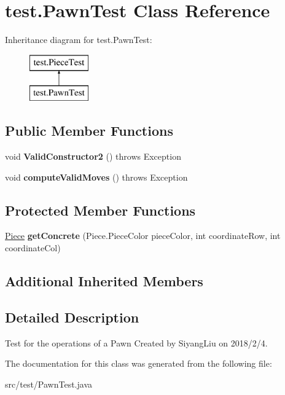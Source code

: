\hypertarget{classtest_1_1_pawn_test}{}\section{test.\+Pawn\+Test Class Reference}
\label{classtest_1_1_pawn_test}
Inheritance diagram for test.\+Pawn\+Test\+:\begin{figure}[H]
\begin{center}
\leavevmode
\includegraphics[height=2.000000cm]{classtest_1_1_pawn_test}
\end{center}
\end{figure}
\subsection*{Public Member Functions}
\begin{DoxyCompactItemize}
\item 
\mbox{\label{classtest_1_1_pawn_test_ac43e71ec6827ee2dede95103f600752b}} 
void {\bfseries Valid\+Constructor2} ()  throws Exception 
\item 
\mbox{\label{classtest_1_1_pawn_test_a6c5484d6c801d4ce7ba09d6a45aad74f}} 
void {\bfseries compute\+Valid\+Moves} ()  throws Exception 
\end{DoxyCompactItemize}
\subsection*{Protected Member Functions}
\begin{DoxyCompactItemize}
\item 
\mbox{\label{classtest_1_1_pawn_test_aa53df44fa4d9b2e462a0be226bfb7ccc}} 
\mbox{\hyperlink{classpieces_1_1_piece}{Piece}} {\bfseries get\+Concrete} (Piece.\+Piece\+Color piece\+Color, int coordinate\+Row, int coordinate\+Col)
\end{DoxyCompactItemize}
\subsection*{Additional Inherited Members}


\subsection{Detailed Description}
Test for the operations of a Pawn Created by Siyang\+Liu on 2018/2/4. 

The documentation for this class was generated from the following file\+:\begin{DoxyCompactItemize}
\item 
src/test/Pawn\+Test.\+java\end{DoxyCompactItemize}
